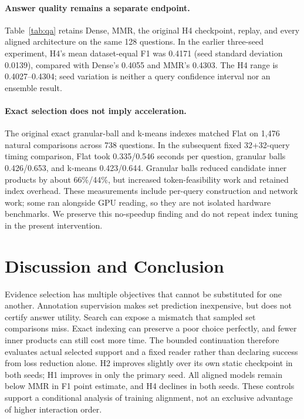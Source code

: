 \documentclass[runningheads]{llncs}
\begin{document}


\paragraph{Answer quality remains a separate endpoint.}
Table~\ref{tab:qa} retains Dense, MMR, the original H4 checkpoint, replay,
and every aligned architecture on the same 128 questions. In the earlier
three-seed experiment, H4's mean dataset-equal F1 was 0.4171 (seed standard
deviation 0.0139), compared with Dense's 0.4055 and MMR's 0.4303.
The H4 range is 0.4027--0.4304; seed variation is neither a query confidence
interval nor an ensemble result.



\paragraph{Exact selection does not imply acceleration.}
The original exact granular-ball and k-means indexes matched Flat on 1,476
natural comparisons across 738 questions. In the subsequent fixed
32+32-query timing comparison, Flat took 0.335/0.546 seconds per question,
granular balls 0.426/0.653, and k-means 0.423/0.644. Granular balls reduced
candidate inner products by about 66\%/44\%, but increased token-feasibility
work and retained index overhead. These measurements include per-query
construction and network work; some ran alongside GPU reading, so they are
not isolated hardware benchmarks. We preserve this no-speedup finding and
do not repeat index tuning in the present intervention.


\section{Discussion and Conclusion}
Evidence selection has multiple objectives that cannot be substituted for
one another. Annotation supervision makes set prediction inexpensive, but
does not certify answer utility. Search can expose a mismatch that sampled
set comparisons miss. Exact indexing can preserve a poor choice perfectly,
and fewer inner products can still cost more time. The bounded continuation
therefore evaluates actual selected support and a fixed reader rather than
declaring success from loss reduction alone. H2 improves slightly over its
own static checkpoint in both seeds; H1 improves in only the primary seed.
All aligned models remain below MMR in F1 point estimate, and H4 declines
in both seeds. These controls support a conditional analysis of
training alignment, not an exclusive advantage of higher interaction order.
\end{document}
